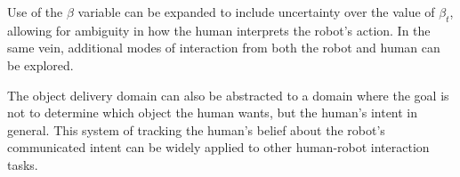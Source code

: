 \documentclass{article}
\begin{document}
Use of the $\beta$ variable can be expanded to include uncertainty over the value of $\beta_t$, allowing for ambiguity in how the human interprets the robot's action. In the same vein, additional modes of interaction from both the robot and human can be explored. 

The object delivery domain can also be abstracted to a domain where the goal is not to determine which object the human wants, but the human's intent in general. This system of tracking the human's belief about the robot's communicated intent can be widely applied to other human-robot interaction tasks. 


\end{document}
